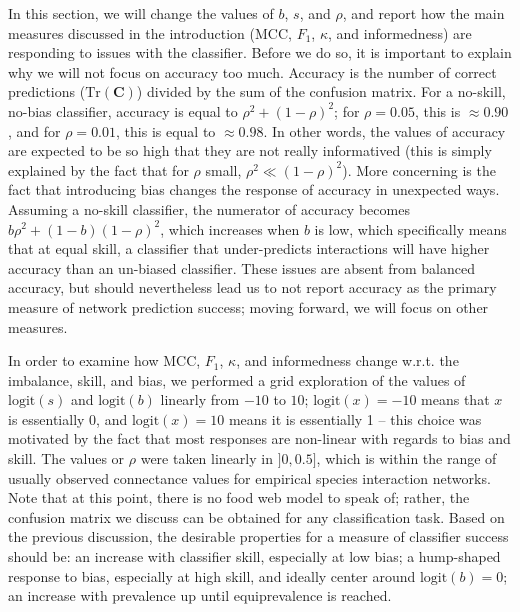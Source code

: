 \documentclass[11pt]{article}
\begin{document}
In this section, we will change the values of \(b\), \(s\), and
\(\rho\), and report how the main measures discussed in the introduction
(MCC, \(F_1\), \(\kappa\), and informedness) are responding to issues
with the classifier. Before we do so, it is important to explain why we
will not focus on accuracy too much. Accuracy is the number of correct
predictions (\(\text{Tr}(\mathbf{C})\)) divided by the sum of the
confusion matrix. For a no-skill, no-bias classifier, accuracy is equal
to \(\rho^2 + (1-\rho)^2\); for \(\rho = 0.05\), this is
\(\approx 0.90\), and for \(\rho = 0.01\), this is equal to
\(\approx 0.98\). In other words, the values of accuracy are expected to
be so high that they are not really informatived (this is simply
explained by the fact that for \(\rho\) small,
\(\rho^2 \ll (1-\rho)^2\)). More concerning is the fact that introducing
bias changes the response of accuracy in unexpected ways. Assuming a
no-skill classifier, the numerator of accuracy becomes
\(b\rho^2 + (1-b)(1-\rho)^2\), which increases when \(b\) is low, which
specifically means that at equal skill, a classifier that under-predicts
interactions will have higher accuracy than an un-biased classifier.
These issues are absent from balanced accuracy, but should nevertheless
lead us to not report accuracy as the primary measure of network
prediction success; moving forward, we will focus on other measures.

In order to examine how MCC, \(F_1\), \(\kappa\), and informedness
change w.r.t. the imbalance, skill, and bias, we performed a grid
exploration of the values of \(\text{logit}(s)\) and \(\text{logit}(b)\)
linearly from \(-10\) to \(10\); \(\text{logit}(x) = -10\) means that
\(x\) is essentially 0, and \(\text{logit}(x) = 10\) means it is
essentially 1 -- this choice was motivated by the fact that most
responses are non-linear with regards to bias and skill. The values or
\(\rho\) were taken linearly in \(]0, 0.5]\), which is within the range
of usually observed connectance values for empirical species interaction
networks. Note that at this point, there is no food web model to speak
of; rather, the confusion matrix we discuss can be obtained for any
classification task. Based on the previous discussion, the desirable
properties for a measure of classifier success should be: an increase
with classifier skill, especially at low bias; a hump-shaped response to
bias, especially at high skill, and ideally center around
\(\text{logit}(b)=0\); an increase with prevalence up until
equiprevalence is reached.
\end{document}
